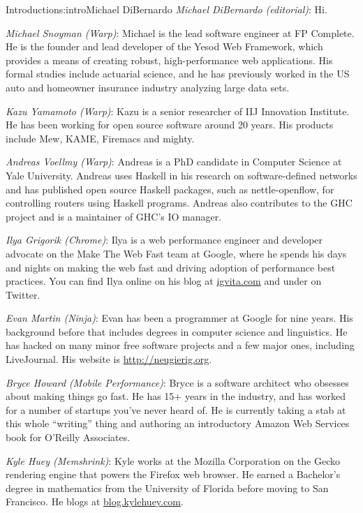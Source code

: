 \begin{aosachapter}{Introduction}{s:intro}{Michael DiBernardo}
\hspace{\parindent} \emph{Michael DiBernardo (editorial)}: Hi.

\emph{Michael Snoyman (Warp)}: Michael is the lead software engineer at FP Complete. He is the founder and lead developer of the Yesod Web Framework, which provides a means of creating robust, high-performance web applications. His formal studies include actuarial science, and he has previously worked in the US auto and homeowner insurance industry analyzing large data sets.

\emph{Kazu Yamamoto (Warp)}: Kazu is a senior researcher of IIJ Innovation Institute. He has been working for open source software around 20 years. His products include Mew, KAME, Firemacs and mighty.

\emph{Andreas Voellmy (Warp)}: Andreas is a PhD candidate in Computer Science at Yale University. Andreas uses Haskell in his research on software-defined networks and has published open source Haskell packages, such as nettle-openflow, for controlling routers using Haskell programs. Andreas also contributes to the GHC project and is a maintainer of GHC's IO manager.

\emph{Ilya Grigorik (Chrome)}: Ilya is a web performance engineer and developer advocate on the Make The Web Fast team at Google, where he spends his days and nights on making the web fast and driving adoption of performance best practices. You can find Ilya online on his blog at \url{igvita.com} and under  on Twitter.  

\emph{Evan Martin (Ninja)}:
Evan has been a programmer at Google for nine years.  His background before that includes degrees in computer science and linguistics.  He has hacked on many minor free software projects and a few major ones, including LiveJournal.  His website is \url{http://neugierig.org}.

\emph{Bryce Howard (Mobile Performance)}: 
Bryce is a software architect who obsesses about making things go fast. He has 15+ years in the industry, and has worked for a number of startups you've never heard of. He is currently taking a stab at this whole ``writing'' thing and authoring an introductory Amazon Web Services book for O'Reilly Associates.

\emph{Kyle Huey (Memshrink)}:
Kyle works at the Mozilla Corporation on the Gecko rendering engine
that powers the Firefox web browser.  He earned a Bachelor's degree in
mathematics from the University of Florida before moving to San Francisco.
He blogs at \url{blog.kylehuey.com}.


\end{aosachapter}
